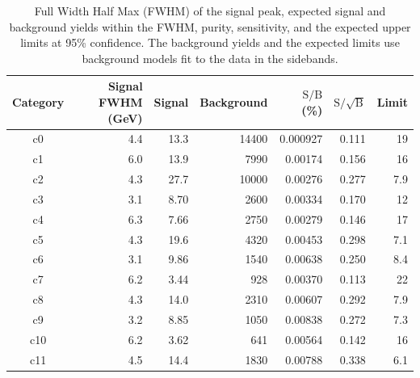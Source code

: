 \begin{table}[htb]
  \caption[The characteristics of each category.]
           {Full Width Half Max (FWHM) of the signal peak, expected signal and background yields within the FWHM,
           purity, sensitivity, and the expected upper limits at 95\% confidence. 
           The background yields and the expected limits use background models fit to the data in the sidebands.}
  \label{tab:cat_resoln}
  \begin{center}
    \begin{tabular}{crrrrrr}
      \hline
      Category  & Signal FWHM (GeV) & Signal & Background & $\mathrm{S / B}$ (\%) & $\mathrm{S / \sqrt{B}}$ & Limit \\  %
      \hline
        c0         &         4.4     &        13.3     &        14400    &        0.000927    &     0.111    &  19    \\
        c1         &         6.0     &        13.9     &        7990     &        0.00174     &     0.156    &  16    \\
        c2         &         4.3     &        27.7     &        10000    &        0.00276     &     0.277    &  7.9   \\
        c3         &         3.1     &        8.70     &        2600     &        0.00334     &     0.170    &  12    \\
        c4         &         6.3     &        7.66     &        2750     &        0.00279     &     0.146    &  17    \\
        c5         &         4.3     &        19.6     &        4320     &        0.00453     &     0.298    &  7.1   \\
        c6         &         3.1     &        9.86     &        1540     &        0.00638     &     0.250    &  8.4   \\
        c7         &         6.2     &        3.44     &        928      &        0.00370     &     0.113    &  22    \\
        c8         &         4.3     &        14.0     &        2310     &        0.00607     &     0.292    &  7.9   \\
        c9         &         3.2     &        8.85     &        1050     &        0.00838     &     0.272    &  7.3   \\
        c10        &         6.2     &        3.62     &        641      &        0.00564     &     0.142    &  16    \\
        c11        &         4.5     &        14.4     &        1830     &        0.00788     &     0.338    &  6.1   \\

\end{tabular}
\end{center}
\end{table}
